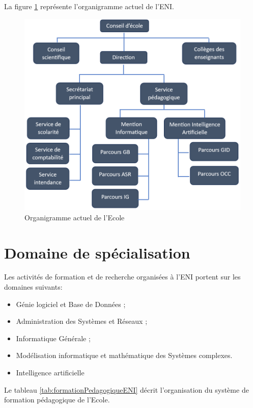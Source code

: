 \documentclass[12pt]{report}
\begin{document}
				La figure \ref{fig:OrganigrammeENI} représente l’organigramme actuel de l’ENI.

				\begin{figure}[h]
					\centering
					\includegraphics[width=\textwidth]{image4.png}
					\caption{Organigramme actuel de l’Ecole}
					\label{fig:OrganigrammeENI}
				\end{figure}
				\clearpage
				
				\section{Domaine de spécialisation}
				\hspace{15pt} Les activités de formation et de recherche organisées à l’ENI portent sur les domaines suivants: 

						\begin{itemize}
							\item Génie logiciel et Base de Données ;
							\item Administration des Systèmes et Réseaux ;
							\item Informatique Générale ;
							\item Modélisation informatique et mathématique des Systèmes complexes.
							\item Intelligence artificielle
						\end{itemize}

				Le tableau \ref{tab:formationPedagogiqueENI} décrit l’organisation du système de formation pédagogique de l’Ecole.
\end{document}
